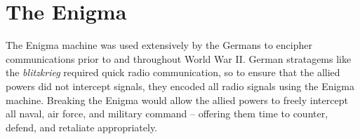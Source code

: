 \chapter{The Enigma}

The Enigma machine was used extensively by the Germans to encipher
communications prior to and throughout World War II. German
stratagems like the \emph{blitzkrieg} required quick radio
communication, so to ensure that the allied powers did not intercept
signals, they encoded all radio signals using the Enigma machine.
Breaking the Enigma would allow the allied powers to freely intercept
all naval, air force, and military command -- offering them time to
counter, defend, and retaliate appropriately. 
